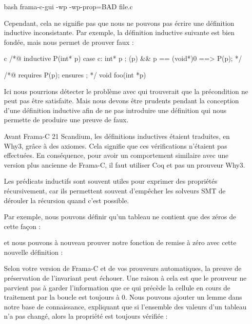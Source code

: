 \begin{CodeBlock}{bash}
frama-c-gui -wp -wp-prop=BAD file.c
\end{CodeBlock}




Cependant, cela ne signifie pas que nous ne pouvons pas écrire une définition
inductive inconsistante. Par exemple, la définition inductive suivante est bien
fondée, mais nous permet de prouver faux :


\begin{CodeBlock}{c}
/*@ inductive P(int* p){
      case c: \forall int* p ; \valid(p) && p == (void*)0 ==> P(p);
    }
*/

/*@ requires P(p);
    ensures \false ; */
void foo(int *p){}
\end{CodeBlock}


Ici nous pourrions détecter le problème avec  qui
trouverait que la précondition ne peut pas être satisfaite. Mais nous devons
être prudents pendant la conception d'une définition inductive afin de ne pas
introduire une définition qui nous permette de produire une preuve de faux.


\begin{Warning}
  Avant Frama-C 21 Scandium, les définitions inductives étaient traduites,
  en Why3, grâce à des axiomes. Cela signifie que ces vérifications n'étaient
  pas effectuées. En conséquence, pour avoir un comportement similaire avec
  une version plus ancienne de Frama-C, il faut utiliser Coq et pas un prouveur
  Why3.
\end{Warning}



Les prédicats inductifs sont souvent utiles pour exprimer des propriétés
récursivement, car ils permettent souvent d'empêcher les solveurs SMT de
dérouler la récursion quand c'est possible.


Par exemple, nous pouvons définir qu'un tableau ne contient que des zéros de
cette façon :




et nous pouvons à nouveau prouver notre fonction de remise à zéro avec cette
nouvelle définition :






Selon votre version de Frama-C et de vos prouveurs automatiques, la preuve de
préservation de l'invariant peut échouer. Une raison à cela est que le prouveur ne
parvient pas à garder l'information que ce qui précède la cellule en cours de
traitement par la boucle est toujours à 0. Nous pouvons ajouter un lemme dans
notre base de connaissance, expliquant que si l'ensemble des valeurs d'un tableau
n'a pas changé, alors la propriété est toujours vérifiée :



